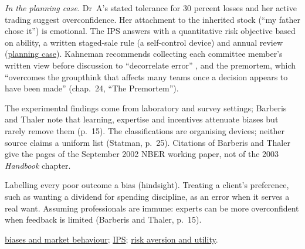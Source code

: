 \begin{qfdefinition}
\emph{In the planning case.} Dr~A's stated tolerance for 30 percent losses and her active trading suggest overconfidence. Her attachment to the inherited stock (``my father chose it'') is emotional. The IPS answers with a quantitative risk objective based on ability, a written staged-sale rule (a self-control device) and annual review (\hyperref[ex:investment-planning-case]{planning case}). Kahneman recommends collecting each committee member's written view before discussion to ``decorrelate error'' \citep[chap.~7, ``Exaggerated Emotional Coherence (Halo Effect)'']{thinking-fast-slow-2011}, and the premortem, which ``overcomes the groupthink that affects many teams once a decision appears to have been made'' (chap.~24, ``The Premortem'').

 The experimental findings come from laboratory and survey settings; Barberis and Thaler note that learning, expertise and incentives attenuate biases but rarely remove them (p.~15). The classifications are organising devices; neither source claims a uniform list (Statman, p.~25). Citations of Barberis and Thaler give the pages of the September 2002 NBER working paper, not of the 2003 \emph{Handbook} chapter.

 Labelling every poor outcome a bias (hindsight). Treating a client's preference, such as wanting a dividend for spending discipline, as an error when it serves a real want. Assuming professionals are immune: experts can be more overconfident when feedback is limited (Barberis and Thaler, p.~15).

 \hyperref[mech:biases-market-anomalies]{biases and market behaviour}; \hyperref[meth:investment-policy-statement]{IPS}; \hyperref[def:risk-aversion-utility]{risk aversion and utility}.

\end{qfdefinition}

